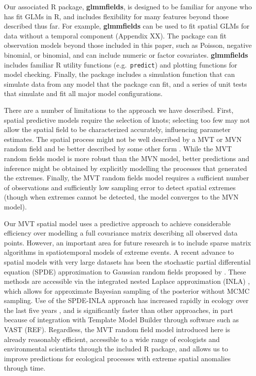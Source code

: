 \documentclass[12pt,english]{article}
\begin{document}
\begin{spacing}{1.9}
Our associated R package, \textbf{glmmfields}, is designed to be familiar for
anyone who has fit GLMs in R, and includes flexibility for many features beyond
those described thus far. For example, \textbf{glmmfields} can be used to fit
spatial GLMs for data without a temporal component (Appendix XX). The package
can fit observation models beyond those included in this paper, such as Poisson,
negative binomial, or binomial, and can include numeric or factor covariates.
\textbf{glmmfields} includes familiar R utility functions (e.g.\
\texttt{predict}) and plotting functions for model checking. Finally, the
package includes a simulation function that can simulate data from any model
that the package can fit, and a series of unit tests that simulate and fit all
major model configurations.

There are a number of limitations to the approach we have described. First,
spatial predictive models require the selection of knots; selecting too few may
not allow the spatial field to be characterized accurately, influencing
parameter estimates. The spatial process might not be well described by a MVT or
MVN random field and be better described by some other form
\citep[e.g.][]{conn2015}. While the MVT random fields model is more robust than
the MVN model, better predictions and inference might be obtained by explicitly
modelling the processes that generated the extremes. Finally, the MVT random
fields model requires a sufficient number of observations and sufficiently low
sampling error to detect spatial extremes (though when extremes cannot be
detected, the model converges to the MVN model).

Our MVT spatial model uses a predictive approach to achieve considerable
efficiency over modelling a full covariance matrix describing all
observed data points. However, an important area for future research is to
include sparse matrix algorithms in spatiotemporal models of extreme events. A
recent advance to spatial models with very large datasets has been the
stochastic partial differential equation (SPDE) approximation to Gaussian random
fields proposed by \citet{lindgren2011}. These methods are accessible via the
integrated nested Laplace approximation (INLA) \citep{rue2009}, which allows for
approximate Bayesian sampling of the posterior without MCMC sampling. Use of the
SPDE-INLA approach has increased rapidly in ecology over the last five years
\citep[e.g.][]{illian2013, ono2016}, and is significantly faster than other
approaches, in part because of integration with Template Model Builder through
software such as VAST (REF). Regardless, the MVT random field model introduced
here is already reasonably efficient, accessible to a wide range of ecologists
and environmental scientists through the included R package, and allows us to
improve predictions for ecological processes with extreme spatial anomalies
through time.


\end{spacing}
\end{document}
